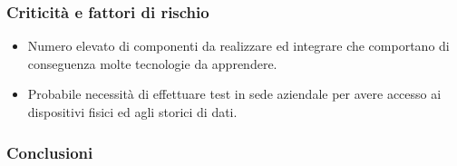 \subsubsection{Criticità e fattori di rischio}
\begin{itemize}
	\item Numero elevato di componenti da realizzare ed integrare che comportano di conseguenza molte tecnologie da apprendere. 
	\item Probabile necessità di effettuare test in sede aziendale per avere accesso ai dispositivi fisici ed agli storici di dati.
\end{itemize}
\subsubsection{Conclusioni}


